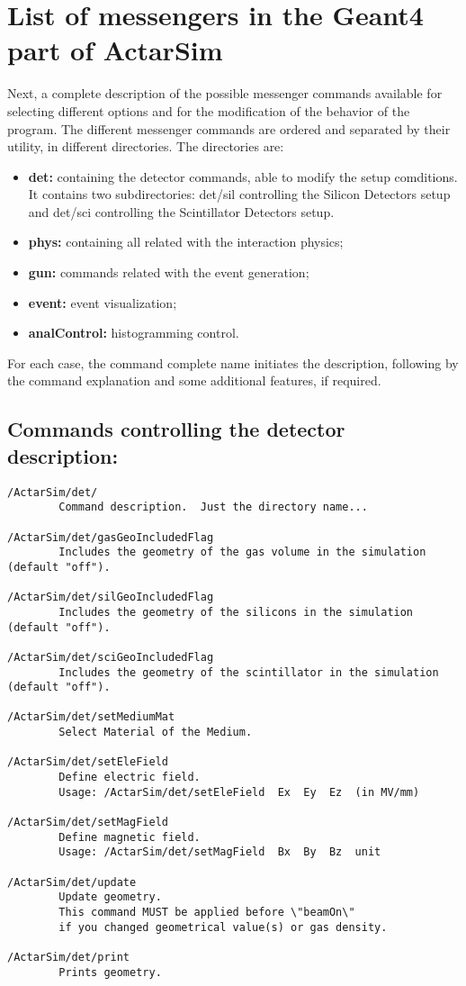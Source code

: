 \section{List of messengers in the Geant4 part of ActarSim}\label{sec-messengers}

Next, a complete description of the possible messenger commands available for selecting different options and for the modification of the behavior of the program. The different messenger commands are ordered and separated by their utility, in different directories. The directories are:
\begin{itemize}
\item \textbf{det:} containing the detector commands, able to modify the setup comditions. It contains two subdirectories:  det/sil controlling the Silicon Detectors setup and det/sci controlling the Scintillator Detectors setup.
\item \textbf{phys:} containing all related with the interaction physics;
\item \textbf{gun:} commands related with the event generation;
\item \textbf{event:} event visualization;
\item \textbf{analControl:} histogramming control.
\end{itemize}

For each case, the command complete name initiates the description, following by the command explanation and some additional features, if required.

\subsection{Commands controlling the detector description:}
\begin{verbatim}
/ActarSim/det/
        Command description.  Just the directory name...

/ActarSim/det/gasGeoIncludedFlag
        Includes the geometry of the gas volume in the simulation (default "off").

/ActarSim/det/silGeoIncludedFlag
        Includes the geometry of the silicons in the simulation (default "off").

/ActarSim/det/sciGeoIncludedFlag
        Includes the geometry of the scintillator in the simulation (default "off").

/ActarSim/det/setMediumMat
        Select Material of the Medium.

/ActarSim/det/setEleField
        Define electric field.
        Usage: /ActarSim/det/setEleField  Ex  Ey  Ez  (in MV/mm)

/ActarSim/det/setMagField
        Define magnetic field.
        Usage: /ActarSim/det/setMagField  Bx  By  Bz  unit

/ActarSim/det/update
        Update geometry.
        This command MUST be applied before \"beamOn\"
        if you changed geometrical value(s) or gas density.

/ActarSim/det/print
        Prints geometry.
\end{verbatim}
 
